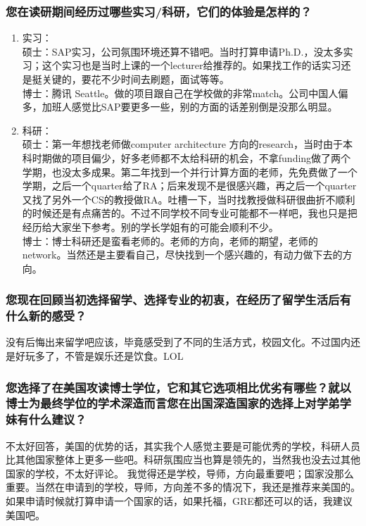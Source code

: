 \documentclass[a4paper,UTF8]{book}
\begin{document}
    \subsubsection*{您在读研期间经历过哪些实习/科研，它们的体验是怎样的？}
        \begin{enumerate}[itemindent=0pt,itemsep=0pt,parsep=0pt]
            \item 实习：\\
            硕士：SAP实习，公司氛围环境还算不错吧。当时打算申请Ph.D.，没太多实习；这个实习也是当时上课的一个lecturer给推荐的。如果找工作的话实习还是挺关键的，要花不少时间去刷题，面试等等。\\
            博士：腾讯 Seattle。做的项目跟自己在学校做的非常match。公司中国人偏多，加班人感觉比SAP要更多一些，别的方面的话差别倒是没那么明显。
            \item 科研：\\
            硕士：第一年想找老师做computer architecture 方向的research，当时由于本科时期做的项目偏少，好多老师都不太给科研的机会，不拿funding做了两个学期，也没太多成果。第二年找到一个并行计算方面的老师，先免费做了一个学期，之后一个quarter给了RA；后来发现不是很感兴趣，再之后一个quarter又找了另外一个CS的教授做RA。吐槽一下，当时找教授做科研很曲折不顺利的时候还是有点痛苦的。不过不同学校不同专业可能都不一样吧，我也只是把经历给大家坐下参考。别的学长学姐有的可能会顺利不少。\\
            博士：博士科研还是蛮看老师的。老师的方向，老师的期望，老师的network。当然还是主要看自己，尽快找到一个感兴趣的，有动力做下去的方向。
        \end{enumerate}
    \subsubsection*{您现在回顾当初选择留学、选择专业的初衷，在经历了留学生活后有什么新的感受？}
    没有后悔出来留学吧应该，毕竟感受到了不同的生活方式，校园文化。不过国内还是好玩多了，不管是娱乐还是饮食。LOL
    \subsubsection*{您选择了在美国攻读博士学位，它和其它选项相比优劣有哪些？就以博士为最终学位的学术深造而言您在出国深造国家的选择上对学弟学妹有什么建议？}
    不太好回答，美国的优势的话，其实我个人感觉主要是可能优秀的学校，科研人员比其他国家整体上更多一些吧。科研氛围应当也算是领先的，当然我也没去过其他国家的学校，不太好评论。
    我觉得还是学校，导师，方向最重要吧；国家没那么重要。当然在申请到的学校，导师，方向差不多的情况下，我还是推荐来美国的。如果申请时候就打算申请一个国家的话，如果托福，GRE都还可以的话，我建议美国吧。
\end{document}
